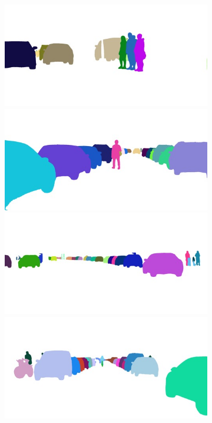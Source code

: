 {\begin{figure}[t]
{{\begin{subfigure}[t]{0.24\linewidth}
\begin{center}
		\includegraphics[width=\linewidth,trim={0px 60px 0 0px},clip]{qualitative/bielefeld_000000_018102_instance_segmentation.jpg}
		\includegraphics[width=\linewidth,trim={0px 60px 0 0px},clip]{qualitative/bielefeld_000000_027586_instance_segmentation.jpg}
		\includegraphics[width=\linewidth,trim={0px 60px 0 0px},clip]{qualitative/munich_000026_000019_instance_segmentation.jpg}
		\includegraphics[width=\linewidth,trim={0px 60px 0 0px},clip]{qualitative/munich_000306_000019_instance_segmentation.jpg}

\end{center}
\end{subfigure}}}
\end{figure}}
